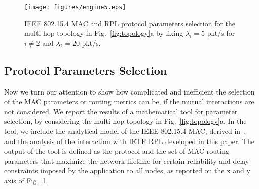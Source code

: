 \documentclass[review, 1p, 11pt]{elsarticle}
\numberwithin{equation}{section}
\begin{document}
\begin{figure}[h!]\centering
  \texttt{[image: figures/engine5.eps]}
  \caption{IEEE 802.15.4 MAC and RPL protocol parameters selection for the multi-hop topology in Fig.~\ref{fig:topology}a by fixing $\lambda_i=5$ pkt/s for $i\neq2$ and $\lambda_2=20$ pkt/s.}\label{fig:selection}
\end{figure}


\subsection{Protocol Parameters Selection}


Now we turn our attention to show how complicated and inefficient the selection of the MAC parameters or routing metrics can be, if the mutual interactions are not considered.
We report the results of a mathematical tool for
parameter selection, by considering the multi-hop topology in Fig.~\ref{fig:topology}a.
In the tool, we include the analytical model of the IEEE 802.15.4 MAC, derived in~\cite{PG_TVT},
and the analysis of the interaction with IETF RPL developed in this paper.
The output of the tool is defined as the protocol and the set of MAC-routing parameters
that maximize the network lifetime for certain reliability
and delay constraints imposed by the application to all nodes, as reported
on the x and y axis of Fig.~\ref{fig:selection}.
\end{document}
